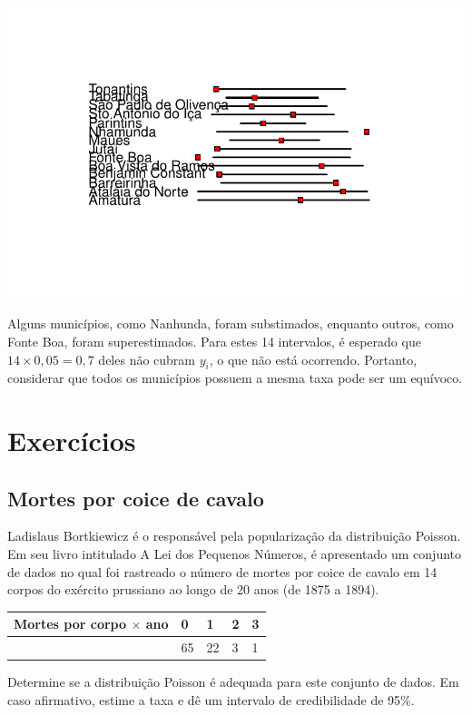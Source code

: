 \documentclass[
  letterpaper,
  DIV=11,
  numbers=noendperiod]{scrreprt}
\theoremstyle{plain}
\theoremstyle{definition}
\theoremstyle{definition}
\theoremstyle{remark}
\begin{document}
\includegraphics{poisson_files/figure-pdf/unnamed-chunk-7-1.pdf}

Alguns municípios, como Nanhunda, foram substimados, enquanto outros,
como Fonte Boa, foram superestimados. Para estes 14 intervalos, é
esperado que \(14\times 0,05=0,7\) deles não cubram \(y_i\), o que não
está ocorrendo. Portanto, considerar que todos os municípios possuem a
mesma taxa pode ser um equívoco.

\section{Exercícios}\label{exercuxedcios-2}

\subsection{Mortes por coice de
cavalo}\label{mortes-por-coice-de-cavalo}

Ladislaus Bortkiewicz é o responsável pela popularização da distribuição
Poisson. Em seu livro intitulado A Lei dos Pequenos Números, é
apresentado um conjunto de dados no qual foi rastreado o número de
mortes por coice de cavalo em 14 corpos do exército prussiano ao longo
de 20 anos (de 1875 a 1894).

\begin{longtable}[]{@{}lllll@{}}
\toprule\noalign{}
Mortes por corpo \(\times\) ano & 0 & 1 & 2 & 3 \\
\midrule\noalign{}
\endhead
\bottomrule\noalign{}
\endlastfoot
109 & 65 & 22 & 3 & 1 \\
\end{longtable}

Determine se a distribuição Poisson é adequada para este conjunto de
dados. Em caso afirmativo, estime a taxa e dê um intervalo de
credibilidade de 95\%.
\end{document}
